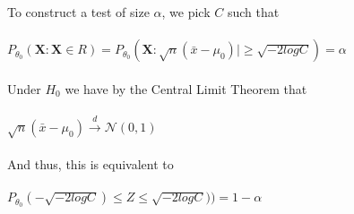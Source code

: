 \documentclass{article}
\begin{document}
\begin{itemize}
    To construct a test of size $\alpha$, we pick $C$ such that\\\\
    $P_{\theta_0}(\textbf{X}:\textbf{X}\in R)=P_{\theta_0}(\textbf{X}:\sqrt{n}(\bar{x}-\mu_0)|\geq\sqrt{-2logC})=\alpha$\\\\
    Under $H_0$ we have by the Central Limit Theorem that\\\\ $\sqrt{n}(\bar{x}-\mu_0)\xrightarrow{d}\mathcal{N}(0,1)$\\\\
    And thus, this is equivalent to\\\\
    $P_{\theta_0}(-\sqrt{-2logC})\leq Z\leq\sqrt{-2logC}))=1-\alpha$
\end{itemize}
\pagebreak
\end{document}
